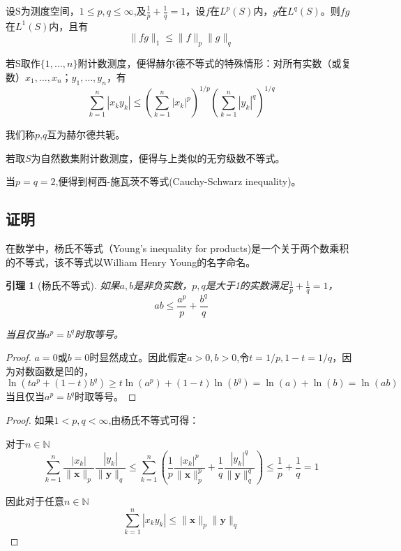 \documentclass[a4paper]{article} %
\numberwithin{equation}{section} %
\newtheorem{Lemma}{引理}
\begin{document}
设S为测度空间，$1\le p,q\le\infty$,及$\displaystyle \frac{1}{p}+\frac{1}{q}=1$，设$f$在$L^p(S)$内，$g$在$L^q(S)$。则$fg$在$L^1(S)$内，且有
$$\|fg\|_1\le \|f\|_p\|g\|_q$$

若S取作$\{1,\ldots,n\}$附计数测度，便得赫尔德不等式的特殊情形：对所有实数（或复数）$x_1,\ldots,x_n$；$y_1,\ldots,y_n$，有
\begin{equation}
\sum_{k=1}^n|x_ky_k|\le\left(\sum_{k=1}^n|x_k|^p\right)^{1/p}\left(\sum_{k=1}^n|y_k|^q\right)^{1/q}
\end{equation}

我们称$p$,$q$互为赫尔德共轭。

若取$S$为自然数集附计数测度，便得与上类似的无穷级数不等式。

当$p=q=2$,便得到柯西-施瓦茨不等式(Cauchy-Schwarz inequality)。

\subsection{证明}

在数学中，杨氏不等式（Young's inequality for products)是一个关于两个数乘积的不等式，该不等式以William Henry Young的名字命名。

\begin{Lemma}[杨氏不等式]
如果$a,b$是非负实数，$p,q$是大于1的实数满足$\displaystyle \frac{1}{p}+\frac{1}{q}=1$，
\begin{equation}
ab\le\frac{a^p}{p}+\frac{b^q}{q}
\end{equation}

当且仅当$a^p=b^q$时取等号。
\end{Lemma}
\begin{proof}
$a=0$或$b=0$时显然成立。因此假定$a>0,b>0$,令$t=1/p,1-t=1/q$，因为对数函数是凹的，
\begin{equation}
\ln(ta^p+(1-t)b^q)\ge t\ln(a^p)+(1-t)\ln(b^q)=\ln(a)+\ln(b)=\ln(ab)
\end{equation}
当且仅当$a^p=b^q$时取等号。
\end{proof}

\begin{proof}
如果$1<p,q<\infty$,由杨氏不等式可得：

对于$n\in\mathbb N$
\begin{equation}
\sum_{k=1}^n\frac{|x_k|}{\|\mathbf{x}\|_p}\frac{|y_k|}{\|\mathbf{y}\|_q}\le\sum_{k=1}^n\left(\frac{1}{p}\frac{|x_k|^p}{\|\mathbf x\|_p^p}+\frac{1}{q}\frac{|y_k|^q}{\|\mathbf{y}\|_q^q}\right)\le\frac{1}{p}+\frac{1}{q}=1
\end{equation}

因此对于任意$n\in\mathbb N$
\begin{equation}
\sum_{k=1}^n|x_ky_k|\le\|\mathbf x\|_p\|\mathbf y\|_q
\end{equation}
\end{proof}
\end{document}
